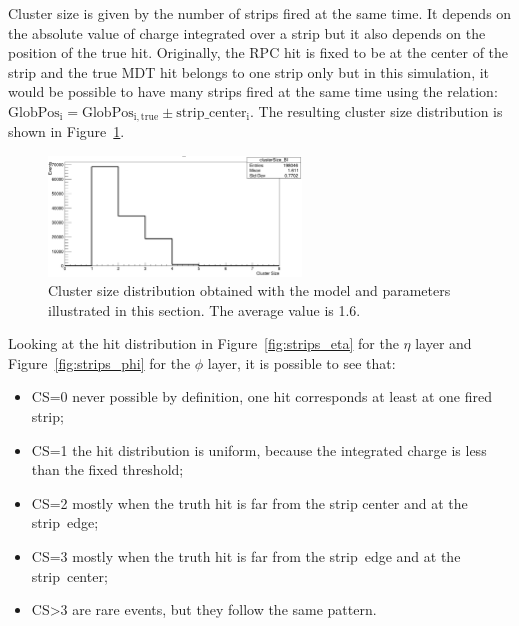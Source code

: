 Cluster size is given by the number of strips fired at the same time. It depends on the absolute value of charge integrated over a strip but it also depends on the position of the true hit.
Originally, the RPC hit is fixed to be at the center of the strip and the true MDT hit belongs to one strip only but in this simulation, it would be possible to have many strips fired at the same time using the relation: $\mathrm{GlobPos_{i} = GlobPos_{i,true}\pm strip\_center_{i}}$. 
The resulting cluster size distribution is shown in Figure~\ref{fig:CS}.
\begin{figure}[!h]
	\centering
	\includegraphics[width=0.6\textwidth]{Chapters/CH3/figures/CS}
	\caption{Cluster size distribution obtained with the model and parameters illustrated in this section. The average value is 1.6.}
	\label{fig:CS}
\end{figure}
\newpage\phantom{}
\noindent Looking at the hit distribution in Figure~\ref{fig:strips_eta} for the $\eta$ layer and Figure~\ref{fig:strips_phi} for the $\phi$ layer, it is possible to see that:
\begin{itemize}
\item CS=0 never possible by definition, one hit corresponds at least at one fired strip;
\item CS=1 the hit distribution is uniform, because the integrated charge is less than the fixed threshold;
\item CS=2 mostly when the truth hit is far from the strip center and at the strip~edge;
\item CS=3 mostly when the truth hit is far from the strip~edge and at the strip~center;
\item CS>3 are rare events, but they follow the same pattern.
\end{itemize}
